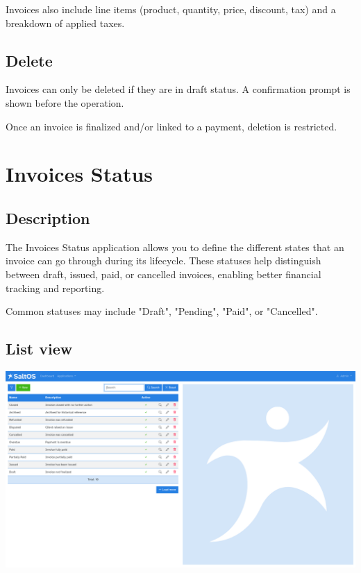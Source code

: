 \documentclass[a4paper]{article}
\begin{document}
Invoices also include line items (product, quantity, price, discount, tax) and a breakdown of applied taxes.

\hypertarget{toc140}{}
\subsection{Delete}

Invoices can only be deleted if they are in draft status.
A confirmation prompt is shown before the operation.

Once an invoice is finalized and/or linked to a payment, deletion is restricted.


\hypertarget{toc141}{}
\section{Invoices Status}

\hypertarget{toc142}{}
\subsection{Description}

The Invoices Status application allows you to define the different states that an invoice can go through during its lifecycle.
These statuses help distinguish between draft, issued, paid, or cancelled invoices, enabling better financial tracking and reporting.

Common statuses may include "Draft", "Pending", "Paid", or "Cancelled".

\hypertarget{toc143}{}
\subsection{List view}

\begin{center}\includegraphics[width=1\textwidth]{../ujest/snaps/test-screenshots-js-screenshots-sales-invoices-status-list-en-us-1-snap.png}\end{center}
\end{document}
